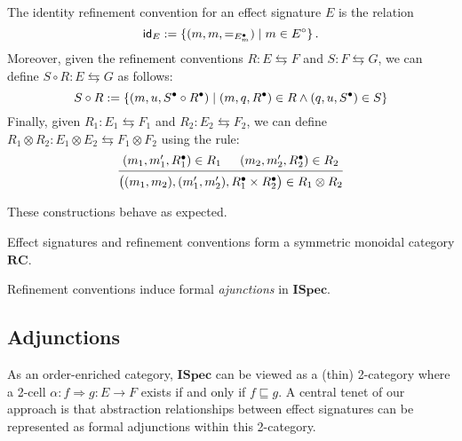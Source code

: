 \documentclass[sigplan,10pt,authordraft]{acmart}
\newcommand{\ISpec}{\mathbf{ISpec}}
\begin{document}
\begin{definition} \label{def:rccomp}
The identity refinement convention
for an effect signature $E$
is the relation
\[
   \mathsf{id} _E := \{(m, m, {=}_{E^\bullet_m}) \mid m \in E^\circ\} \,.
\]
Moreover,
given the refinement conventions
$R : E \leftrightarrows F$
and
$S : F \leftrightarrows G$,
we can define
$S \circ R : E \leftrightarrows G$ as follows:
\[
  S \circ R :=
    \{ (m, u, S^\bullet \circ R^\bullet) \mid
       (m, q, R^\bullet) \in R \wedge
       (q, u, S^\bullet) \in S \}
\]
Finally, given
$R_1 : E_1 \leftrightarrows F_1$ and
$R_2 : E_2 \leftrightarrows F_2$,
we can define
$R_1 \otimes R_2 : E_1 \otimes E_2 \leftrightarrows F_1 \otimes F_2$
using the rule:
\[
  \begin{prooftree}
    \hypo{(m_1, m_1', R_1^\ans) \in R_1}
    \hypo{(m_2, m_2', R_2^\ans) \in R_2}
    \infer2{
      \big( (m_1, m_2), (m_1', m_2'), R_1^\ans \times R_2^\ans \big)
      \in R_1 \otimes R_2}
  \end{prooftree}
\]
\end{definition}

\noindent
These constructions behave as expected.

\begin{theorem}
Effect signatures and refinement conventions
form a symmetric monoidal category $\mathbf{RC}$.
\end{theorem}

\noindent
Refinement conventions induce formal \emph{ajunctions} in $\ISpec$.


\subsection{Adjunctions} %

As an order-enriched category,
$\ISpec$ can be viewed as a (thin) 2-category
where
a 2-cell $\alpha : f \Rightarrow g : E \rightarrow F$ exists
if and only if $f \sqsubseteq g$.
A central tenet of our approach
is that abstraction relationships
between effect signatures
can be represented as formal adjunctions
within this 2-category.
\end{document}
